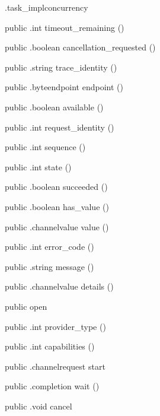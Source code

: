 \begin{CrexxClass}{.task\_impl}{concurrency}
\begin{Members}
    \Method
      {public}
      {.int}
      {timeout\_remaining}
      {()}

    \Method
      {public}
      {.boolean}
      {cancellation\_requested}
      {()}

    \Method
      {public}
      {.string}
      {trace\_identity}
      {()}

    \Method
      {public}
      {.byteendpoint}
      {endpoint}
      {()}

    \Method
      {public}
      {.boolean}
      {available}
      {()}

    \Method
      {public}
      {.int}
      {request\_identity}
      {()}

    \Method
      {public}
      {.int}
      {sequence}
      {()}

    \Method
      {public}
      {.int}
      {state}
      {()}

    \Method
      {public}
      {.boolean}
      {succeeded}
      {()}

    \Method
      {public}
      {.boolean}
      {has\_value}
      {()}

    \Method
      {public}
      {.channelvalue}
      {value}
      {()}

    \Method
      {public}
      {.int}
      {error\_code}
      {()}

    \Method
      {public}
      {.string}
      {message}
      {()}

    \Method
      {public}
      {.channelvalue}
      {details}
      {()}

    \Factory
      {public}
      {open}
      {}

    \Method
      {public}
      {.int}
      {provider\_type}
      {()}

    \Method
      {public}
      {.int}
      {capabilities}
      {()}

    \Method
      {public}
      {.channelrequest}
      {start}
      {}

    \Method
      {public}
      {.completion}
      {wait}
      {()}

    \Method
      {public}
      {.void}
      {cancel}
      {}


\end{Members}
\end{CrexxClass}
